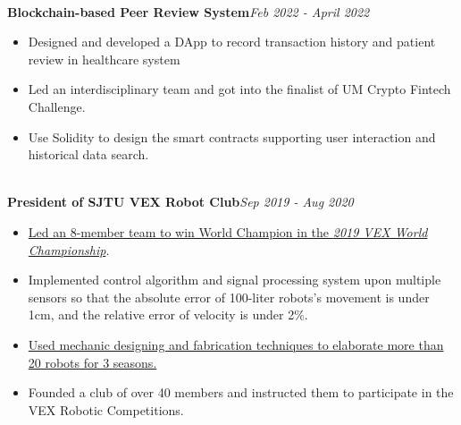 \documentclass[10pt,a4paper]{article}
\begin{document}
\noindent\\
\textbf{Blockchain-based Peer Review System}\hfill\emph{Feb 2022 - April 2022}
\begin{itemize}[noitemsep,topsep=0pt]
    \item Designed and developed a DApp to record transaction history and patient review in healthcare system 
    \item Led an interdisciplinary team and got into the finalist of UM Crypto Fintech Challenge.
    \item Use Solidity to design the smart contracts supporting user interaction and historical data search.
\end{itemize}
\noindent\\
\textbf{President of SJTU VEX Robot Club}\hfill\emph{Sep 2019 - Aug 2020}
\begin{itemize}[noitemsep,topsep=0pt]
    \item \href{https://www.youtube.com/watch?v=7ysdbzLXAT4}{Led an 8-member team to win World Champion in the \emph{2019 VEX World Championship}}.
    \item Implemented control algorithm and signal processing system upon multiple sensors so that the absolute error of 100-liter robots's movement is under 1cm, and the relative error of velocity is under 2\%.
    \item \href{https://www.robotevents.com/teams/VEXU/SJTU1}{Used mechanic designing and fabrication techniques to elaborate more than 20 robots for 3 seasons.}
    \item Founded a club of over 40 members and instructed them to participate in the VEX Robotic Competitions.
\end{itemize}
\end{document}
